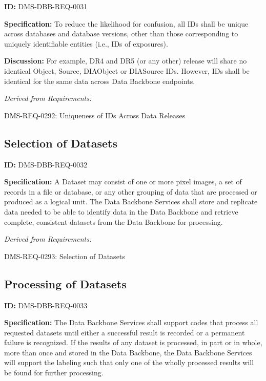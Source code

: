 \documentclass[SE,toc]{lsstdoc}
\begin{document}
\label{DMS-DBB-REQ-0031}
\textbf{ID:} DMS-DBB-REQ-0031

\textbf{Specification:}
To reduce the likelihood for confusion, all IDs shall be unique across databases and database versions, other than those corresponding to uniquely identifiable entities (i.e., IDs of exposures).

\textbf{Discussion:}
For example, DR4 and DR5 (or any other) release will share no identical Object, Source, DIAObject or DIASource IDs.    However, IDs shall be identical for the same data across Data Backbone endpoints.

\emph{Derived from Requirements:}

DMS-REQ-0292:
Uniqueness of IDs Across Data Releases \newline

\subsection{Selection of Datasets}

\label{DMS-DBB-REQ-0032}
\textbf{ID:} DMS-DBB-REQ-0032

\textbf{Specification:}
A Dataset may consist of one or more pixel images, a set of records in a file or database, or any other grouping of data that are processed or produced as a logical unit. The Data Backbone Services shall store and replicate data needed to be able to identify data in the Data Backbone and retrieve complete, consistent datasets from the Data Backbone for processing.

\emph{Derived from Requirements:}

DMS-REQ-0293:
Selection of Datasets \newline

\subsection{Processing of Datasets}

\label{DMS-DBB-REQ-0033}
\textbf{ID:} DMS-DBB-REQ-0033

\textbf{Specification:}
The Data Backbone Services shall support codes that process all requested datasets until either a successful result is recorded or a permanent failure is recognized. If the results of any dataset is processed, in part or in whole, more than once and stored in the Data Backbone, the Data Backbone Services will support the labeling such that only one of the wholly processed results will be found for further processing.
\end{document}
